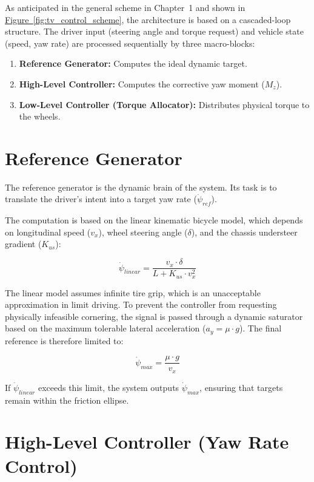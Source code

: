 \documentclass[12pt]{report}
\begin{document}
As anticipated in the general scheme in Chapter~1 and shown in \hyperref[fig:tv_control_scheme]{Figure~\ref*{fig:tv_control_scheme}}, the architecture is based on a cascaded-loop structure. The driver input (steering angle and torque request) and vehicle state (speed, yaw rate) are processed sequentially by three macro-blocks:

\begin{enumerate}
  \item \textbf{Reference Generator:} Computes the ideal dynamic target.
  \item \textbf{High-Level Controller:} Computes the corrective yaw moment ($M_z$).
  \item \textbf{Low-Level Controller (Torque Allocator):} Distributes physical torque to the wheels.
\end{enumerate}

\section{Reference Generator}
\label{sec:reference_generator}

The reference generator is the dynamic brain of the system. Its task is to translate the driver's intent into a target yaw rate ($\dot{\psi}_{ref}$).

The computation is based on the linear kinematic bicycle model, which depends on longitudinal speed ($v_x$), wheel steering angle ($\delta$), and the chassis understeer gradient ($K_{us}$):

\[
\dot{\psi}_{linear} = \frac{v_x \cdot \delta}{L + K_{us} \cdot v_x^2}
\]

The linear model assumes infinite tire grip, which is an unacceptable approximation in limit driving. To prevent the controller from requesting physically infeasible cornering, the signal is passed through a dynamic saturator based on the maximum tolerable lateral acceleration ($a_y = \mu \cdot g$). The final reference is therefore limited to:

\[
\dot{\psi}_{max} = \frac{\mu \cdot g}{v_x}
\]

If $\dot{\psi}_{linear}$ exceeds this limit, the system outputs $\dot{\psi}_{max}$, ensuring that targets remain within the friction ellipse.

\section{High-Level Controller (Yaw Rate Control)}
\label{sec:high_level_controller}
\end{document}
